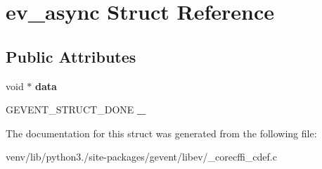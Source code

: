 \hypertarget{structev__async}{}\section{ev\+\_\+async Struct Reference}
\label{structev__async}
\subsection*{Public Attributes}
\begin{DoxyCompactItemize}
\item 
\mbox{\label{structev__async_a213857b070fa9cf51d6de46e705632e0}} 
void $\ast$ {\bfseries data}
\item 
\mbox{\label{structev__async_a33f7d9c71705912b244af1d162efc48d}} 
G\+E\+V\+E\+N\+T\+\_\+\+S\+T\+R\+U\+C\+T\+\_\+\+D\+O\+NE {\bfseries \+\_\+}
\end{DoxyCompactItemize}


The documentation for this struct was generated from the following file\+:\begin{DoxyCompactItemize}
\item 
venv/lib/python3./site-\/packages/gevent/libev/\+\_\+corecffi\+\_\+cdef.\+c\end{DoxyCompactItemize}
